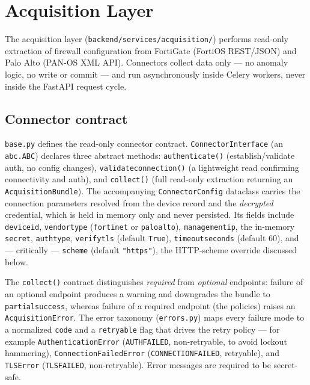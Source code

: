 \documentclass[12pt,a4paper]{report}
\renewcommand{\_}{\textunderscore\allowbreak}
\begin{document}
\section{Acquisition Layer}
\label{sec:ch4-acquisition}

The acquisition layer (\texttt{backend/services/acquisition/}) performs read-only extraction of firewall configuration from FortiGate (FortiOS REST/JSON) and Palo Alto (PAN-OS XML API). Connectors collect data only --- no anomaly logic, no write or commit --- and run asynchronously inside Celery workers, never inside the FastAPI request cycle.

\subsection*{Connector contract}

\texttt{base.py} defines the read-only connector contract. \texttt{ConnectorInterface} (an \texttt{abc.ABC}) declares three abstract methods: \texttt{authenticate()} (establish/validate auth, no config changes), \texttt{validate\_connection()} (a lightweight read confirming connectivity and auth), and \texttt{collect()} (full read-only extraction returning an \texttt{AcquisitionBundle}). The accompanying \texttt{ConnectorConfig} dataclass carries the connection parameters resolved from the device record and the \emph{decrypted} credential, which is held in memory only and never persisted. Its fields include \texttt{device\_id}, \texttt{vendor\_type} (\texttt{fortinet} or \texttt{paloalto}), \texttt{management\_ip}, the in-memory \texttt{secret}, \texttt{auth\_type}, \texttt{verify\_tls} (default \texttt{True}), \texttt{timeout\_seconds} (default 60), and --- critically --- \texttt{scheme} (default \texttt{"https"}), the HTTP-scheme override discussed below.

The \texttt{collect()} contract distinguishes \emph{required} from \emph{optional} endpoints: failure of an optional endpoint produces a warning and downgrades the bundle to \texttt{partial\_success}, whereas failure of a required endpoint (the policies) raises an \texttt{AcquisitionError}. The error taxonomy (\texttt{errors.py}) maps every failure mode to a normalized \texttt{code} and a \texttt{retryable} flag that drives the retry policy --- for example \texttt{AuthenticationError} (\texttt{AUTH\_FAILED}, non-retryable, to avoid lockout hammering), \texttt{ConnectionFailedError} (\texttt{CONNECTION\_FAILED}, retryable), and \texttt{TLSError} (\texttt{TLS\_FAILED}, non-retryable). Error messages are required to be secret-safe.
\end{document}

